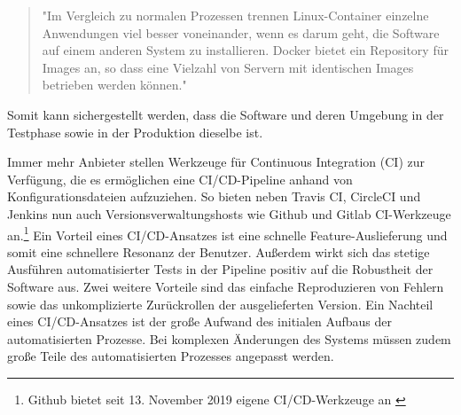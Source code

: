 \begin{quote}
"Im Vergleich zu normalen Prozessen trennen Linux-Container
einzelne Anwendungen viel besser voneinander, wenn es darum geht, die Software auf einem anderen
System zu installieren. Docker bietet ein Repository für Images an, so dass eine Vielzahl
von Servern mit identischen Images betrieben werden können."\cite[S. 56]{ContinuousDeliveryWolff}
\end{quote}

Somit kann sichergestellt werden, dass die Software und deren Umgebung in der Testphase
sowie in der Produktion dieselbe ist.

Immer mehr Anbieter stellen Werkzeuge für Continuous Integration (CI) zur Verfügung,
die es ermöglichen eine CI/CD-Pipeline anhand von Konfigurationsdateien aufzuziehen. So bieten
neben Travis CI, CircleCI und Jenkins nun auch Versionsverwaltungshosts wie Github und
Gitlab CI-Werkzeuge an.\footnote{Github bietet seit 13. November 2019 eigene CI/CD-Werkzeuge an \cite{GithubCIToolsHeise}}
Ein Vorteil eines CI/CD-Ansatzes ist eine schnelle Feature-Auslieferung und somit eine schnellere Resonanz der Benutzer.
Außerdem wirkt sich das stetige Ausführen automatisierter Tests in der Pipeline positiv auf die Robustheit der Software aus.
Zwei weitere Vorteile sind das einfache Reproduzieren von Fehlern sowie das unkomplizierte Zurückrollen der ausgelieferten Version.
Ein Nachteil eines CI/CD-Ansatzes ist der große Aufwand des initialen Aufbaus der automatisierten Prozesse.
Bei komplexen Änderungen des Systems müssen zudem große Teile des automatisierten Prozesses angepasst werden.
